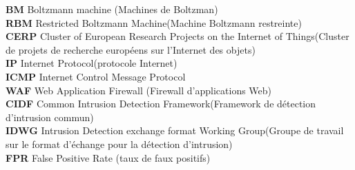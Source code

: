  \textbf{BM} \hspace{0.5cm}Boltzmann machine (Machines de Boltzman)\\
 \textbf{RBM} \hspace{0.5cm} Restricted Boltzmann Machine(Machine Boltzmann restreinte)\\
 \textbf{CERP}\hspace{0.5cm} Cluster of European Research Projects on the Internet of Things(Cluster de projets de recherche européens sur l'Internet des objets)\\
 \textbf{IP}\hspace{0.5cm} Internet Protocol(protocole Internet)\\
 \textbf{ICMP}\hspace{0.5cm} Internet Control Message Protocol\\
 \textbf{WAF} \hspace{0.5cm}Web Application Firewall (Firewall d'applications Web) \\
 \textbf{CIDF} \hspace{0.5cm} Common Intrusion Detection Framework(Framework de détection d'intrusion commun) \\
\textbf{IDWG} \hspace{0.5cm} Intrusion Detection exchange format Working Group(Groupe de travail sur le format d'échange pour la détection d'intrusion)\\
\textbf{FPR} \hspace{0.5cm} False Positive Rate (taux de faux positifs)

 